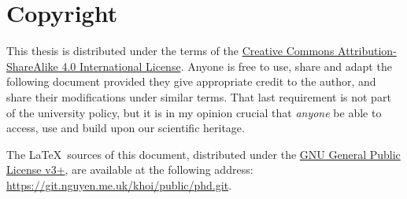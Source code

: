 \chapter*{Copyright}

This thesis is distributed under the terms of the
\href{http://creativecommons.org/licenses/by-sa/4.0/}{Creative Commons Attribution-ShareAlike 4.0 International License}.
Anyone is free to use, share and adapt the following document
provided they give appropriate credit to the author,
and share their modifications under similar terms.
That last requirement is not part of the university policy,
but it is in my opinion crucial that \emph{anyone} be able to access, use and build upon our scientific heritage.

The \LaTeX\ sources of this document,
distributed under the \href{https://www.gnu.org/licenses/gpl.html}{GNU General Public License v3+},
are available at the following address: \url{https://git.nguyen.me.uk/khoi/public/phd.git}.
